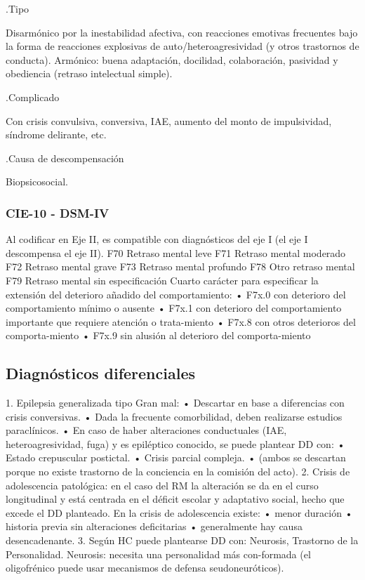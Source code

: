 .Tipo

Disarmónico por la inestabilidad afectiva, con reacciones emotivas frecuentes bajo la forma de reacciones explosivas de auto/heteroagresividad (y otros trastornos de conducta). Armónico: buena adaptación, docilidad, colaboración, pasividad y obediencia (retraso intelectual simple).

.Complicado

Con crisis convulsiva, conversiva, IAE, aumento del monto de impulsividad, síndrome delirante, etc.

.Causa de descompensación

Biopsicosocial.
\subsubsection*{CIE-10 - DSM-IV}
Al codificar en Eje II, es compatible con diagnósticos del eje I (el eje I descompensa el eje II). F70 Retraso mental leve F71 Retraso mental moderado F72 Retraso mental grave F73 Retraso mental profundo F78 Otro retraso mental F79 Retraso mental sin especificación Cuarto carácter para especificar la extensión del deterioro añadido del comportamiento: • F7x.0 con deterioro del comportamiento mínimo o ausente • F7x.1 con deterioro del comportamiento importante que requiere atención o trata-miento • F7x.8 con otros deterioros del comporta-miento • F7x.9 sin alusión al deterioro del comporta-miento
\subsection*{Diagnósticos diferenciales}
1. Epilepsia generalizada tipo Gran mal: • Descartar en base a diferencias con crisis conversivas. • Dada la frecuente comorbilidad, deben realizarse estudios paraclínicos. • En caso de haber alteraciones conductuales (IAE, heteroagresividad, fuga) y es epiléptico conocido, se puede plantear DD con: • Estado crepuscular postictal. • Crisis parcial compleja. • (ambos se descartan porque no existe trastorno de la conciencia en la comisión del acto).
2. Crisis de adolescencia patológica: en el caso del RM la alteración se da en el curso longitudinal y está centrada en el déficit escolar y adaptativo social, hecho que excede el DD planteado. En la crisis de adolescencia existe: • menor duración • historia previa sin alteraciones deficitarias • generalmente hay causa desencadenante.
3. Según HC puede plantearse DD con: Neurosis, Trastorno de la Personalidad. Neurosis: necesita una personalidad más con-formada (el oligofrénico puede usar mecanismos de defensa seudoneuróticos).

